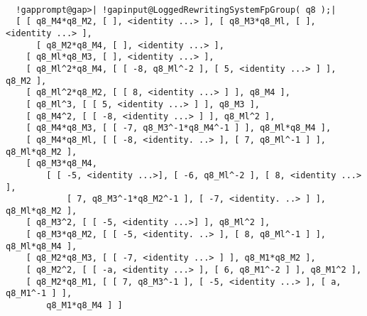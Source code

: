 \documentclass[a4paper,11pt]{report}
\begin{document}
{{{ }

 
\begin{Verbatim}[commandchars=!@|,fontsize=\small,frame=single,label=Example]
  
  !gapprompt@gap>| !gapinput@LoggedRewritingSystemFpGroup( q8 );|
  [ [ q8_M4*q8_M2, [ ], <identity ...> ], [ q8_M3*q8_Ml, [ ], <identity ...> ], 
      [ q8_M2*q8_M4, [ ], <identity ...> ], 
    [ q8_Ml*q8_M3, [ ], <identity ...> ], 
    [ q8_Ml^2*q8_M4, [ [ -8, q8_Ml^-2 ], [ 5, <identity ...> ] ], q8_M2 ], 
    [ q8_Ml^2*q8_M2, [ [ 8, <identity ...> ] ], q8_M4 ], 
    [ q8_Ml^3, [ [ 5, <identity ...> ] ], q8_M3 ], 
    [ q8_M4^2, [ [ -8, <identity ...> ] ], q8_Ml^2 ], 
    [ q8_M4*q8_M3, [ [ -7, q8_M3^-1*q8_M4^-1 ] ], q8_Ml*q8_M4 ], 
    [ q8_M4*q8_Ml, [ [ -8, <identity. ..> ], [ 7, q8_Ml^-1 ] ], q8_Ml*q8_M2 ], 
    [ q8_M3*q8_M4, 
        [ [ -5, <identity ...>], [ -6, q8_Ml^-2 ], [ 8, <identity ...> ], 
            [ 7, q8_M3^-1*q8_M2^-1 ], [ -7, <identity. ..> ] ], q8_Ml*q8_M2 ], 
    [ q8_M3^2, [ [ -5, <identity ...>] ], q8_Ml^2 ], 
    [ q8_M3*q8_M2, [ [ -5, <identity. ..> ], [ 8, q8_Ml^-1 ] ], q8_Ml*q8_M4 ], 
    [ q8_M2*q8_M3, [ [ -7, <identity ...> ] ], q8_M1*q8_M2 ], 
    [ q8_M2^2, [ [ -a, <identity ...> ], [ 6, q8_M1^-2 ] ], q8_M1^2 ], 
    [ q8_M2*q8_M1, [ [ 7, q8_M3^-1 ], [ -5, <identity ...> ], [ a, q8_M1^-1 ] ], 
        q8_M1*q8_M4 ] ] 
  
\end{Verbatim}
 }

 }

         
\end{document}
